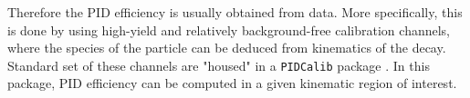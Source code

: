 Therefore the \gls{PID} efficiency is usually obtained from data. More specifically, this is done by using high-yield and relatively background-free calibration channels, where the species of the particle can be deduced from kinematics of the decay. Standard set of these channels are "housed" in a \texttt{PIDCalib} package \cite{Anderlini:2202412}. In this package, \gls{PID} efficiency can be computed in a given kinematic region of interest. 


